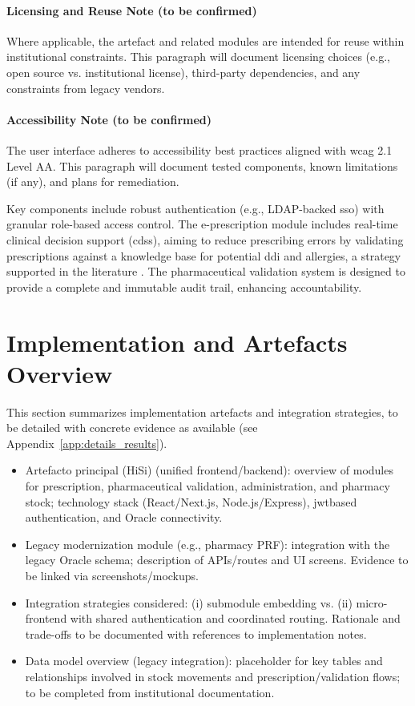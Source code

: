 \paragraph{Licensing and Reuse Note (to be confirmed)}
Where applicable, the artefact and related modules are intended for reuse within institutional constraints. This paragraph will document licensing choices (e.g., open source vs. institutional license), third-party dependencies, and any constraints from legacy vendors.

\paragraph{Accessibility Note (to be confirmed)}
The user interface adheres to accessibility best practices aligned with \gls{wcag} 2.1 Level AA. This paragraph will document tested components, known limitations (if any), and plans for remediation.

Key components include robust authentication (e.g., LDAP-backed \gls{sso}) with granular role-based access control. The e-prescription module includes real-time clinical decision support (\gls{cdss}), aiming to reduce prescribing errors by validating prescriptions against a knowledge base for potential \gls{ddi} and allergies, a strategy supported in the literature \cite{bates2014}. The pharmaceutical validation system is designed to provide a complete and immutable audit trail, enhancing accountability.

\section{Implementation and Artefacts Overview}
This section summarizes implementation artefacts and integration strategies, to be detailed with concrete evidence as available (see Appendix~\ref{app:details_results}).
\begin{itemize}
    \item Artefacto principal (HiSi) (unified frontend/backend): overview of modules for prescription, pharmaceutical validation, administration, and pharmacy stock; technology stack (React/Next.js, Node.js/\-Express), \gls{jwt}\-based authentication, and Oracle connectivity.
    \item Legacy modernization module (e.g., pharmacy PRF): integration with the legacy Oracle schema; description of APIs/routes and UI screens. Evidence to be linked via screenshots/mockups.
    \item Integration strategies considered: (i) submodule embedding vs. (ii) micro-frontend with shared authentication and coordinated routing. Rationale and trade-offs to be documented with references to implementation notes.
    \item Data model overview (legacy integration): placeholder for key tables and relationships involved in stock movements and prescription/validation flows; to be completed from institutional documentation.
\end{itemize}

